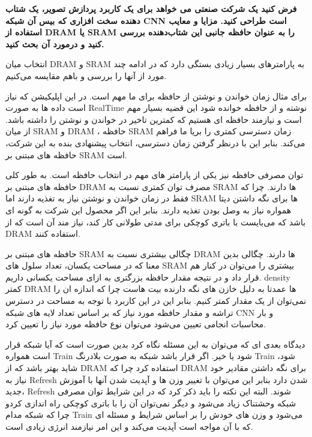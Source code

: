 \documentclass[12pt]{exam}
\newcommand{\class}{\ThesisClass}
\begin{document}

\pagestyle{empty}


\pagestyle{head}
\firstpageheader{}{}{}
\runningheader{صفحه \thepage\ از \numpages}{}{\class}
\runningheadrule

\vspace{0pt}


\begin{questions}
	
	
	\question
	\textbf{فرض کنید یک شرکت صنعتی می خواهد برای یک کاربرد پردازش تصویر، یک شتاب دهنده سخت افزاری که بیس آن شبکه CNN است طراحی کنید. مزایا و معایب استفاده از DRAM یا SRAM را به عنوان حافظه جانبی این شتاب‌دهنده بررسی کنید و درمورد آن بحث کنید.}
	
	
	
	انتخاب میان DRAM و SRAM به پارامتر‌های بسیار زیادی بستگی دارد که در ادامه چند مورد از آنها را بررسی و باهم مقایسه می‌کنیم.
	
	برای مثال زمان خواندن و نوشتن از حافظه برای ما مهم است. در این اپلیکیشن که نیاز است داده ها به صورت RealTime نوشته و از حافظه خوانده شود این قضیه بسیار مهم است و نیازمند حافظه ای هستیم که کمترین تاخیر در خواندن و نوشتن را داشته باشد. از میان SRAM و DRAM ،‌ حافظه SRAM زمان دسترسی کمتری را بریا ما فراهم می‌کند. بنابر این با درنظر گرفتن زمان دسترسی،‌ انتخاب پیشنهادی بنده به این شرکت،‌ حافظه های مبتنی بر SRAM است.
	
	
	توان مصرفی حافظه نیز یکی از پارامتر های مهم در انتخاب حافظه است. به طور کلی حافظه های مبتنی بر DRAM مصرف توان کمتری نسبت به SRAM ها دارند. چرا که فقط در زمان خواندن و نوشتن نیاز به تغذیه دارند اما SRAM ها برای نگه داشتن دیتا همواره نیاز به وصل بودن تغذیه دارند. بنابر این  اگر محصول این شرکت به گونه ای باشد که می‌بایست با باتری کوچکی برای مدتی طولانی کار کند، نیاز مند آن است که از DRAM استفاده کنند.
	
	حافظه های مبتنی بر SRAM چگالی بیشتری نسبت به DRAM ها دارند. چگالی بدین معنا که در مساحت یکسان، تعداد سلول های SRAM بیشتری را می‌توان در کنار هم قرار داد و در نتیجه مقدار حافظه بزرگتری به ازای مساحت یکسانی داریم. density کمتر DRAM ها عمدتا به دلیل خازن های نگه دارنده بیت هاست چرا که اندازه ان را نمی‌توان از یک مقدار کمتر کنیم. بنابر این در این کاربرد با توجه به مساحت در دسترس تراشه و مقدار حافظه مورد نیاز که بر اساس تعداد لایه های شبکه CNN و بار محاسبات انجامی تعیین می‌شود می‌توان نوع حافظه مورد نیاز را تعیین کرد.
	

دیدگاه بعدی ای که می‌توان به این مسئله نگاه کرد بدین صورت است که آیا شبکه قرار است همواره Train شود یا خیر. اگر قرار باشد شبکه به صورت بلادرنگ Train شود، شاید بهتر باشد که از DRAM استفاده کرد چرا که DRAM برای نگه داشتن مقادیر خود نیاز به Refresh شدن دارد بنابر این می‌توان با تغییر وزن ها و آپدیت شدن آنها با آموزش جدید، Refresh شوند. البته این نکته را باید ذکر کرد که در این شرایط توان مصرفی شبکه وحشتناک زیاد می‌شود و دیگر نمی‌توان آن را با باتری کوچکی راه اندازی کردو چرا که شبکه مدام Train می‌شود و وزن های خودش را بر اساس شرایط و مسئله ای که با آن مواجه است آپدیت می‌کند و این امر نیازمند انرژی زیادی است.



\end{questions}
\end{document}
